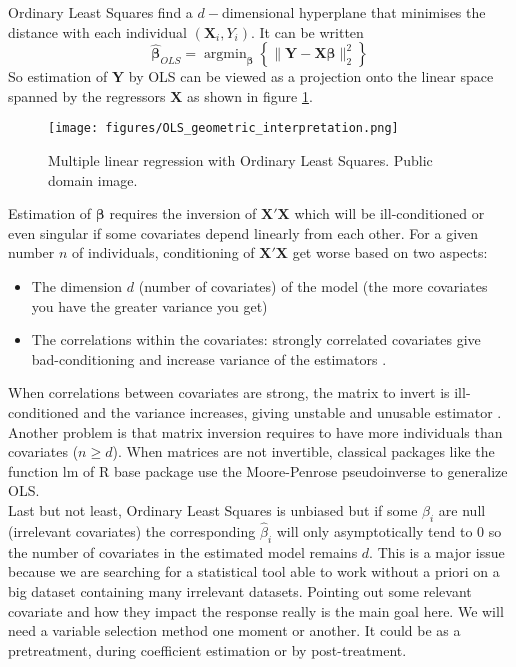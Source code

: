 \documentclass[12pt,a4paper]{report}
\begin{document}
	Ordinary Least Squares find a $d-$dimensional hyperplane that minimises the distance with each individual $(\boldsymbol{X}_i,Y_i)$. It can be written
	\begin{equation}
		\boldsymbol{\hat{\beta}}_{OLS}=\operatorname{argmin}_{\boldsymbol{\beta}}\left\lbrace \parallel \boldsymbol{Y}-\boldsymbol{X\beta}\parallel_2^2 \right\rbrace
	\end{equation}
	So estimation of $\boldsymbol{Y}$ by OLS can be viewed as a projection onto the linear space spanned by the regressors $\boldsymbol{X}$ as shown in figure \ref{geomOLS}.%
	\begin{figure}[h!]
	\centering
	\texttt{[image: figures/OLS\_geometric\_interpretation.png]}
	\caption{Multiple linear regression with Ordinary Least Squares. Public domain image.} \label{geomOLS}
	\end{figure}
	
	Estimation of $\boldsymbol{\beta}$ requires the inversion of $\boldsymbol{X}'\boldsymbol{X}$ which will be ill-conditioned or even singular if some covariates depend linearly from each other. 
For a given number $n$ of individuals, conditioning of $\boldsymbol{X}'\boldsymbol{X}$ get worse based on two aspects: 
\begin{itemize}
	\item The dimension $d$ (number of covariates) of the model (the more covariates you have the greater variance you get)
	\item The correlations within the covariates: strongly correlated covariates give bad-conditioning and increase variance of the estimators .
\end{itemize}
	When correlations between covariates are strong, the matrix to invert is ill-conditioned and the variance increases, giving unstable and unusable estimator \cite{hoerl1970ridge}.
	Another problem is that matrix inversion requires to have more individuals than covariates ($n\geq d$).
	When matrices are not invertible, classical packages like the function lm of R base package \cite{packagebase} use the Moore-Penrose pseudoinverse \cite{PSP:2043984} to generalize OLS.	\\	
		
	Last but not least, Ordinary Least Squares is unbiased but if some $\beta_i$ are null (irrelevant covariates) the corresponding $\hat{\beta}_i$ will only asymptotically tend to 0 so the number of covariates in the estimated model remains $d$. This is a major issue because we are searching for a statistical tool able to work without a priori on a big dataset containing many irrelevant datasets. Pointing out some relevant covariate and how they impact the response really is the main goal here. We will need a variable selection method one moment or another. It could be as a pretreatment, during coefficient estimation or by post-treatment. \\
	
\end{document}
